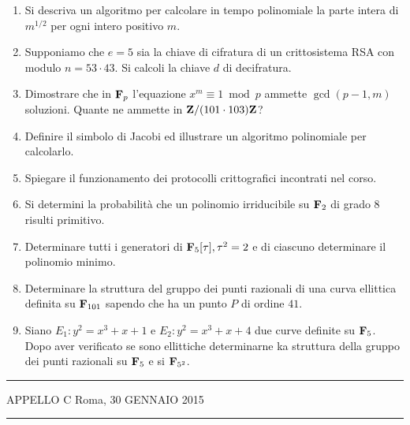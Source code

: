 \documentclass[a4paper,12pt]{article}
\begin{document}
\begin{enumerate}
\item Si descriva un algoritmo per calcolare in tempo polinomiale la parte intera di $m^{1/2}$ per ogni intero positivo $m$.
\item Supponiamo che $e=5$ sia la chiave di cifratura di un crittosistema RSA con modulo $n=53\cdot43$. Si calcoli la chiave $d$ di 
decifratura.
\item Dimostrare che in ${\bf F}_p$ l'equazione $x^m\equiv1\bmod p$ ammette $\gcd(p-1,m)$ soluzioni. Quante ne ammette in ${\bf Z}/(101\cdot 103){\bf Z}$?
\item Definire il simbolo di Jacobi ed illustrare un algoritmo polinomiale per calcolarlo.
\item Spiegare il funzionamento dei protocolli crittografici incontrati nel corso.
\item Si determini la probabilit\`a che un polinomio irriducibile su ${\bf F}_2$ di grado $8$ risulti primitivo.
\item Determinare tutti i generatori di ${\bf F}_{5}[\tau], \tau^2=2$ e di ciascuno determinare il polinomio minimo.
\item Determinare la struttura del gruppo dei punti razionali di una curva ellittica definita su ${\bf F}_{101}$ sapendo che
ha un punto $P$ di ordine $41$.
\item Siano $E_1: y^2=x^3+x+1$ e $E_2: y^2=x^3+x+4$ due curve definite su ${\bf F}_5$. Dopo aver verificato se sono ellittiche determinarne ka struttura della
 gruppo dei punti razionali su ${\bf F}_5$ e si ${\bf F}_{5^2}$.
\end{enumerate}

\hrule\smallskip

\noindent APPELLO C \hfill Roma, 30 GENNAIO 2015 

\hrule\smallskip
\end{document}
